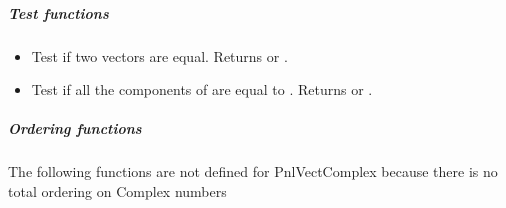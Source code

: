 \subparagraph{Test functions}

\begin{itemize}
\item {}
  \sshortdescribe Test if two vectors are equal. Returns  or
  .
\item {}
  \sshortdescribe Test if all the components of  are equal to
  . Returns  or .
\end{itemize}

\subparagraph{Ordering functions}
The following functions are not defined for PnlVectComplex because there is
no total ordering on Complex numbers

